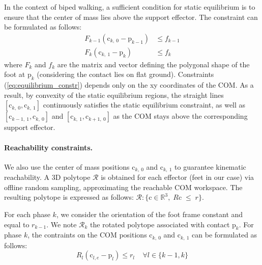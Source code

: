 In the context of biped walking, a sufficient condition for static equilibrium is to ensure that the center of mass lies above the support effector.
The constraint can be formulated as follows:
\begin{equation}
    \label{eq:equilibrium_constr}
    \begin{aligned}
        F_{k-1} (\mbox{c}_{k,\:0}-\mbox{p}_{k-1}) &\leq  f_{k-1}\\%
        F_{k} (\mbox{c}_{k,\:1}-\mbox{p}_{k}) &\leq  f_{k}%
    \end{aligned}
\end{equation}
where $F_k$ and $f_k$ are the matrix and vector defining the polygonal shape of the foot at $\mbox{p}_k$ (considering the contact lies on flat ground).
Constraints (\ref{eq:equilibrium_constr}) depends only on the xy coordinates of the COM.
As a result, by convexity of the static equilibrium regions, the straight lines $[\mbox{c}_{k,\:0}, \mbox{c}_{k,\:1}]$ continuously satisfies the static equilibrium
constraint, as well as $[\mbox{c}_{k-1,\:1}, \mbox{c}_{k,\:0}]$ and $[\mbox{c}_{k,\:1}, \mbox{c}_{k+1,\:0}]$ as the COM stays above the corresponding support effector.

\paragraph{Reachability constraints.}
We also use the center of mass positions $\mbox{c}_{k,\:0}$ and $\mbox{c}_{k,\:1}$ to guarantee kinematic reachability.
A 3D polytope $\mathcal{R}$ is obtained for each effector (feet in our case) via offline random sampling, approximating the reachable COM workspace.
The resulting polytope is expressed as follows: $\mathcal{R} : \{\mbox{c} \in \mathbb{R}^3 , \; \! R \mbox{c} \; \leq \; \! r\}$.

For each phase $k$, we consider the orientation of the foot frame constant and equal to $r_{k-1}$.
We note $\mathcal{R}_k$ the rotated polytope associated with contact $\mbox{p}_{k}$.
For phase $k$, the contraints on the COM positions $\mbox{c}_{k,\:0}$ and $\mbox{c}_{k,\:1}$ can be formulated as follows:
\begin{equation}
    R_{l} (\mbox{c}_{l,e} - \mbox{p}_{l}) \leq r_l \;\;\;\; \forall l \in \{k-1,k\}
\end{equation}

